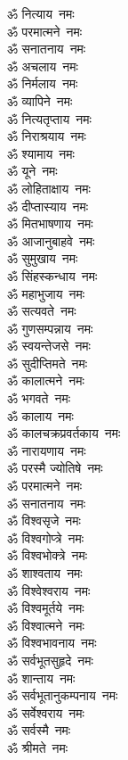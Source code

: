 \begin{multicols}{2}
\begin{flushleft}
ॐ नित्याय~नमः\\
ॐ परमात्मने~नमः\\
ॐ सनातनाय~नमः\hfill{}\\
ॐ अचलाय~नमः\\
ॐ निर्मलाय~नमः\\
ॐ व्यापिने~नमः\\
ॐ नित्यतृप्ताय~नमः\\
ॐ निराश्रयाय~नमः\\
ॐ श्यामाय~नमः\\
ॐ यूने~नमः\\
ॐ लोहिताक्षाय~नमः\\
ॐ दीप्तास्याय~नमः\\
ॐ मितभाषणाय~नमः\hfill{}\\
ॐ आजानुबाहवे~नमः\\
ॐ सुमुखाय~नमः\\
ॐ सिंहस्कन्धाय~नमः\\
ॐ महाभुजाय~नमः\\
ॐ सत्यवते~नमः\\
ॐ गुणसम्पन्नाय~नमः\\
ॐ स्वयन्तेजसे~नमः\\
ॐ सुदीप्तिमते~नमः\\
ॐ कालात्मने~नमः\\
ॐ भगवते~नमः\hfill{}\\
ॐ कालाय~नमः\\
ॐ कालचक्रप्रवर्तकाय~नमः\\
ॐ नारायणाय~नमः\\
ॐ परस्मै ज्योतिषे~नमः\\
ॐ परमात्मने~नमः\\
ॐ सनातनाय~नमः\\
ॐ विश्वसृजे~नमः\\
ॐ विश्वगोप्त्रे~नमः\\
ॐ विश्वभोक्त्रे~नमः\\
ॐ शाश्वताय~नमः\hfill{}\\
ॐ विश्वेश्वराय~नमः\\
ॐ विश्वमूर्तये~नमः\\
ॐ विश्वात्मने~नमः\\
ॐ विश्वभावनाय~नमः\\
ॐ सर्वभूतसुहृदे~नमः\\
ॐ शान्ताय~नमः\\
ॐ सर्वभूतानुकम्पनाय~नमः\\
ॐ सर्वेश्वराय~नमः\\
ॐ सर्वस्मै~नमः\\
ॐ श्रीमते~नमः\hfill{}\\

\end{flushleft}
\end{multicols}
